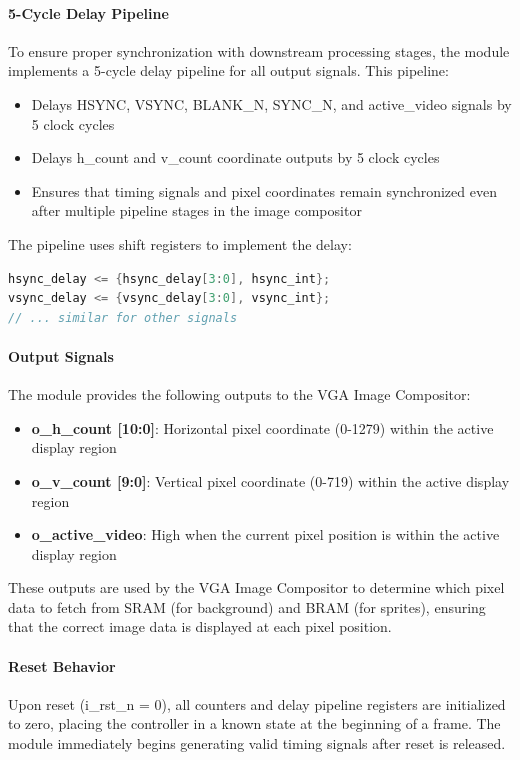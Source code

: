 \documentclass[12pt,a4paper]{article}
\begin{document}
\paragraph{5-Cycle Delay Pipeline}
To ensure proper synchronization with downstream processing stages, the module implements a 5-cycle delay pipeline for all output signals. This pipeline:
\begin{itemize}
    \item Delays HSYNC, VSYNC, BLANK\_N, SYNC\_N, and active\_video signals by 5 clock cycles
    \item Delays h\_count and v\_count coordinate outputs by 5 clock cycles
    \item Ensures that timing signals and pixel coordinates remain synchronized even after multiple pipeline stages in the image compositor
\end{itemize}

The pipeline uses shift registers to implement the delay:
\begin{lstlisting}[language=Verilog, basicstyle=\ttfamily\small]
hsync_delay <= {hsync_delay[3:0], hsync_int};
vsync_delay <= {vsync_delay[3:0], vsync_int};
// ... similar for other signals
\end{lstlisting}

\paragraph{Output Signals}
The module provides the following outputs to the VGA Image Compositor:
\begin{itemize}
    \item \textbf{o\_h\_count [10:0]}: Horizontal pixel coordinate (0-1279) within the active display region
    \item \textbf{o\_v\_count [9:0]}: Vertical pixel coordinate (0-719) within the active display region
    \item \textbf{o\_active\_video}: High when the current pixel position is within the active display region
\end{itemize}

These outputs are used by the VGA Image Compositor to determine which pixel data to fetch from SRAM (for background) and BRAM (for sprites), ensuring that the correct image data is displayed at each pixel position.

\paragraph{Reset Behavior}
Upon reset (i\_rst\_n = 0), all counters and delay pipeline registers are initialized to zero, placing the controller in a known state at the beginning of a frame. The module immediately begins generating valid timing signals after reset is released.
\end{document}
